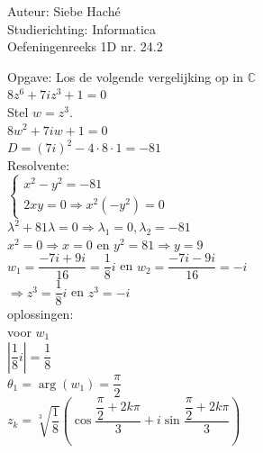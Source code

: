\documentclass[a4paper]{article}
\begin{document}
\noindent \large Auteur: Siebe Haché \\
\noindent \large Studierichting: Informatica\\
\noindent \large Oefeningenreeks 1D nr. 24.2\\

\newcommand{\Bgtan}{\operatorname{Bgtan}}
\medskip
\normalsize

Opgave: Los de volgende vergelijking op in $\mathbb{C}$\\

$8z^6 + 7iz^3 + 1 = 0$\\

Stel $w = z^3$. \\

$8w^2 + 7iw + 1 = 0$\\

$D = (7i)^2 - 4 \cdot 8 \cdot 1 = -81$\\

Resolvente:\\

$\left\{ \begin{array}{l} 
	x^2 - y^2 = -81\\ 
	
	2xy = 0 \Rightarrow x^2(-y^2) = 0 
\end{array} \right. $\\

$\lambda^2 + 81\lambda = 0 \Rightarrow \lambda_1 = 0, \lambda_2 = -81$\\

$x^2 = 0 \Rightarrow x = 0$ en $y^2 = 81 \Rightarrow y = 9$\\

$w_1 = \dfrac{-7i + 9i}{16} = \dfrac{1}{8}i$ en $w_2 = \dfrac{-7i - 9i}{16} = -i$\\

$\Rightarrow z^3 = \dfrac{1}{8}i$ en $z^3 = -i$\\


oplossingen:\\

voor $w_1$\\

$\left|\dfrac{1}{8}i\right| = \dfrac{1}{8}$\\

$\theta_1 = \arg(w_1) = \dfrac{\pi}{2}$\\

$z_k = \sqrt[3]{\dfrac{1}{8}} \left( \cos \dfrac{\dfrac{\pi}{2} + 2k\pi}{3} + i \sin \dfrac{\dfrac{\pi}{2} + 2k\pi}{3} \right)$\\
\end{document}

